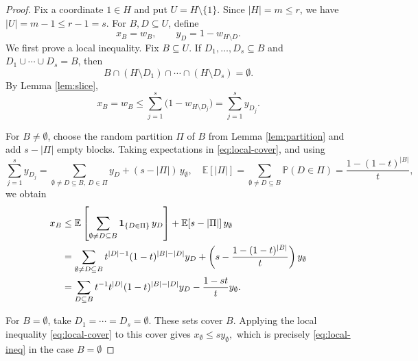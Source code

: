 \documentclass[10pt,a4paper]{amsart}
\begin{document}
\begin{proof}
Fix a coordinate $1\in H$ and put $U=H\setminus\{1\}$. Since  $|H|=m\le r$, we have $|U|=m-1\le r-1=s$.
For $B,D\subseteq U$, define
$$
 x_B=w_B,
 \qquad y_D=1-w_{H\setminus D}.
$$
We first prove a local inequality.  Fix $B\subseteq U$.  If
$D_1,\ldots,D_s\subseteq B$ and $D_1\cup\cdots\cup D_s=B$, then
$$
 B\cap(H\setminus D_1)\cap\cdots\cap(H\setminus D_s)=\emptyset.
$$
By Lemma \ref{lem:slice},
\begin{equation}\label{eq:local-cover}
 x_B=w_B\le\sum_{j=1}^s\bigl(1-w_{H\setminus D_j}\bigr)
        =\sum_{j=1}^s y_{D_j}.
\end{equation}

For $B\ne\emptyset$, choose the random partition $\Pi$ of $B$ from
Lemma \ref{lem:partition} and add $s-|\Pi|$ empty blocks.  Taking expectations in
\eqref{eq:local-cover}, and using
$$
\sum_{j=1}^s y_{D_j}
=
\sum_{\emptyset\neq D\subseteq B,\ D\in\Pi} y_D
+
(s-|\Pi|)\,y_\emptyset,\quad \mathbb E[|\Pi|]=\sum_{\emptyset\ne D\subseteq B}\mathbb P(D\in\Pi)
          =\frac{1-(1-t)^{|B|}}{t},
$$
we obtain
\begin{align}
 x_B&\le
\mathbb E\left[\sum_{\emptyset\neq D\subseteq B}\mathbf 1_{\{D\in\Pi\}}\,y_D\right]
+
\mathbb E[s-|\Pi|]\,y_\emptyset\notag\\
 &=\sum_{\emptyset\ne D\subseteq B}t^{|D|-1}(1-t)^{|B|-|D|}y_D
     +\left(s-\frac{1-(1-t)^{|B|}}{t}\right)y_\emptyset \notag\\
 &=\sum_{D\subseteq B}t^{-1}t^{|D|}(1-t)^{|B|-|D|}y_D
     -\frac{1-st}{t}y_\emptyset .        \label{eq:local-ineq}
\end{align}

For $B=\emptyset$, take $D_1=\cdots=D_s=\emptyset$. These sets cover $B$. Applying the local inequality \eqref{eq:local-cover} to this cover gives
$
x_\emptyset \le s y_\emptyset,
$
which is precisely \eqref{eq:local-ineq} in the case $B=\emptyset$






\end{proof}
\end{document}
